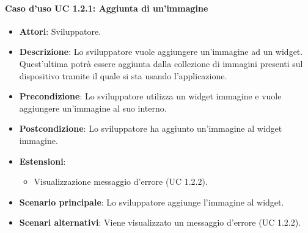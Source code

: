 \paragraph{Caso d'uso UC 1.2.1: Aggiunta di un'immagine}

\FloatBarrier
\begin{itemize}
\item\textbf{Attori}: Sviluppatore.
\item\textbf{Descrizione}: Lo sviluppatore vuole aggiungere un'immagine ad un widget. Quest'ultima potrà essere aggiunta dalla collezione di immagini presenti sul dispositivo tramite il quale si sta usando l'applicazione.
\item\textbf{Precondizione}: Lo sviluppatore utilizza un widget immagine e vuole aggiungere un'immagine al suo interno.
\item\textbf{Postcondizione}: Lo sviluppatore ha aggiunto un'immagine al widget immagine.
\item\textbf{Estensioni}: 
\begin{itemize}
\item Visualizzazione messaggio d'errore (UC 1.2.2).
\end{itemize}
\item\textbf{Scenario principale}: Lo sviluppatore aggiunge l'immagine al widget.
\item\textbf{Scenari alternativi}: Viene visualizzato un messaggio d'errore (UC 1.2.2).
\end{itemize}

